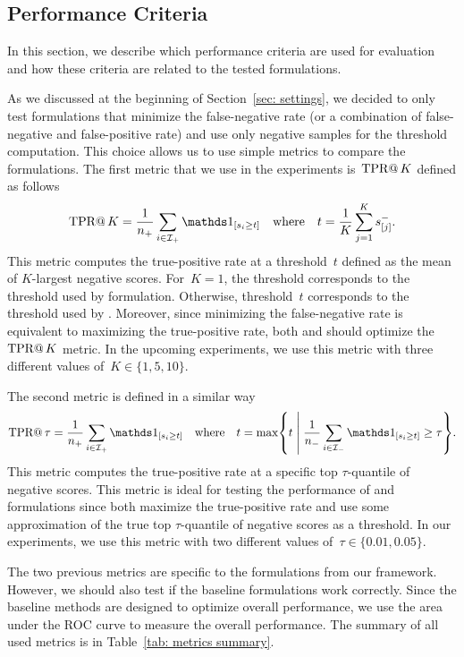 \subsection{Performance Criteria}\label{sec: performance criteria}

In this section, we describe which performance criteria are used for evaluation and how these criteria are related to the tested formulations.

As we discussed at the beginning of Section~\ref{sec: settings}, we decided to only test formulations that minimize the false-negative rate (or a combination of false-negative and false-positive rate) and use only negative samples for the threshold computation. This choice allows us to use simple metrics to compare the formulations. The first metric that we use in the experiments is~$\operatorname{TPR@}K$ defined as follows
\begin{equation*}
  \tpratk = \frac{1}{\npos} \sum_{i \in \Ipos} \Iverson{s_i \geq t} \quad \text{where} \quad t = \frac{1}{K} \sum_{j = 1}^{K} s^{-}_{[j]}.
\end{equation*}
This metric computes the true-positive rate at a threshold~$t$ defined as the mean of $K$-largest negative scores. For~$K = 1$, the threshold corresponds to the threshold used by \TopPush formulation. Otherwise, threshold~$t$ corresponds to the threshold used by \TopPushK. Moreover, since minimizing the false-negative rate is equivalent to maximizing the true-positive rate, both \TopPush and \TopPushK should optimize the $\operatorname{TPR@}K$ metric. In the upcoming experiments, we use this metric with three different values of~$K \in \{1, 5, 10\}.$

The second metric is defined in a similar way
\begin{equation*}
  \tpratfpr = \frac{1}{\npos} \sum_{i \in \Ipos} \Iverson{s_i \geq t} \quad \text{where} \quad t
  = \max \Set{t}{\frac{1}{\nneg} \sum_{i \in \Ineg} \Iverson{s_i \geq t} \geq \tau}.
\end{equation*}
This metric computes the true-positive rate at a specific top $\tau$-quantile of negative scores. This metric is ideal for testing the performance of \tauFPL and \PatMatNP formulations since both maximize the true-positive rate and use some approximation of the true top $\tau$-quantile of negative scores as a threshold. In our experiments, we use this metric with two different values of~$\tau \in \{0.01, 0.05\}.$

The two previous metrics are specific to the formulations from our framework. However, we should also test if the baseline formulations work correctly. Since the baseline methods are designed to optimize overall performance, we use the area under the ROC curve to measure the overall performance. The summary of all used metrics is in Table~\ref{tab: metrics summary}.

